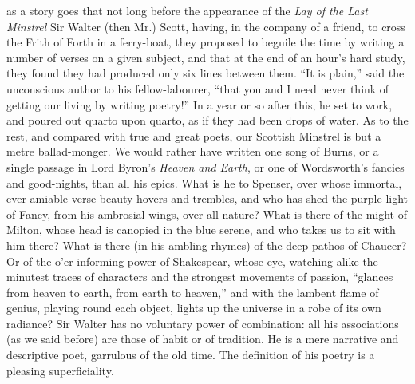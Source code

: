 as a story goes that not long before the appearance of the \emph{Lay of
the Last Minstrel} Sir Walter (then Mr.) Scott, having, in the
company of a friend, to cross the Frith of Forth in a ferry-boat,
they proposed to beguile the time by writing a number of verses on
a given subject, and that at the end of an hour's hard study, they
found they had produced only six lines between them. ``It is
plain,'' said the unconscious author to his fellow-labourer, ``that
you and I need never think of getting our living by writing
poetry!'' In a year or so after this, he set to work, and poured
out quarto upon quarto, as if they had been drops of water. As to
the rest, and compared with true and great poets, our Scottish
Minstrel is but a metre ballad-monger. We would rather have
written one song of Burns, or a single passage in Lord Byron's
\emph{Heaven and Earth}, or one of Wordsworth's fancies and
good-nights, than all his epics. What is he to Spenser, over
whose immortal, ever-amiable verse beauty hovers and trembles, and
who has shed the purple light of Fancy, from his ambrosial wings,
over all nature? What is there of the might of Milton, whose head
is canopied in the blue serene, and who takes us to sit with him
there? What is there (in his ambling rhymes) of the deep pathos of
Chaucer? Or of the o'er-informing power of Shakespear, whose eye,
watching alike the minutest traces of characters and the strongest
movements of passion, ``glances from heaven to earth, from earth to
heaven,'' and with the lambent flame of genius, playing round each
object, lights up the universe in a robe of its own radiance? Sir
Walter has no voluntary power of combination: all his associations
(as we said before) are those of habit or of tradition. He is a
mere narrative and descriptive poet, garrulous of the old
time. The definition of his poetry is a pleasing superficiality.

